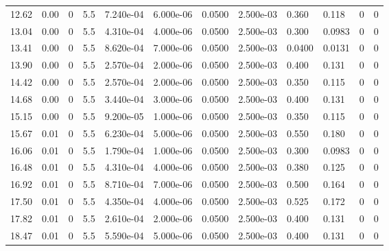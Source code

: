 \documentclass[preview]{standalone}
\begin{document}
{{\begin{tabular}{L{1.2cm}C{1.2cm} C{0.3cm}C{0.5cm} C{1.4cm}C{1.4cm} C{1.4cm}C{1.4cm} C{1.6cm}C{1.6cm} C{1.6cm}C{1.6cm}}
  12.62  &  0.00  & 0     & 5.5 &  7.240e-04  & 6.000e-06  &  0.0500&   2.500e-03& 0.360 & 0.118   &  0 & 0  \\ 
  13.04  &  0.00  & 0     & 5.5 &  4.310e-04  & 4.000e-06  &  0.0500&   2.500e-03& 0.300 & 0.0983   &  0 & 0  \\ 
  13.41  &  0.00  & 0     & 5.5 &  8.620e-04  & 7.000e-06  &  0.0500&   2.500e-03& 0.0400 & 0.0131   &  0 & 0  \\ 
  13.90  &  0.00  & 0     & 5.5 &  2.570e-04  & 2.000e-06  &  0.0500&   2.500e-03& 0.400 & 0.131   &  0 & 0  \\ 
  14.42  &  0.00  & 0     & 5.5 &  2.570e-04  & 2.000e-06  &  0.0500&   2.500e-03& 0.350 & 0.115   &  0 & 0  \\ 
  14.68  &  0.00  & 0     & 5.5 &  3.440e-04  & 3.000e-06  &  0.0500&   2.500e-03& 0.400 & 0.131   &  0 & 0  \\ 
  15.15  &  0.00  & 0     & 5.5 &  9.200e-05  & 1.000e-06  &  0.0500&   2.500e-03& 0.350 & 0.115   &  0 & 0  \\ 
  15.67  &  0.01  & 0     & 5.5 &  6.230e-04  & 5.000e-06  &  0.0500&   2.500e-03& 0.550 & 0.180   &  0 & 0  \\ 
  16.06  &  0.01  & 0     & 5.5 &  1.790e-04  & 1.000e-06  &  0.0500&   2.500e-03& 0.300 & 0.0983   &  0 & 0  \\ 
  16.48  &  0.01  & 0     & 5.5 &  4.310e-04  & 4.000e-06  &  0.0500&   2.500e-03& 0.380 & 0.125   &  0 & 0  \\ 
  16.92  &  0.01  & 0     & 5.5 &  8.710e-04  & 7.000e-06  &  0.0500&   2.500e-03& 0.500 & 0.164   &  0 & 0  \\ 
  17.50  &  0.01  & 0     & 5.5 &  4.350e-04  & 4.000e-06  &  0.0500&   2.500e-03& 0.525 & 0.172   &  0 & 0  \\ 
  17.82  &  0.01  & 0     & 5.5 &  2.610e-04  & 2.000e-06  &  0.0500&   2.500e-03& 0.400 & 0.131   &  0 & 0  \\ 
  18.47  &  0.01  & 0     & 5.5 &  5.590e-04  & 5.000e-06  &  0.0500&   2.500e-03& 0.400 & 0.131   &  0 & 0  \\ 
\hline 
\end{tabular} 

}}
\end{document}
